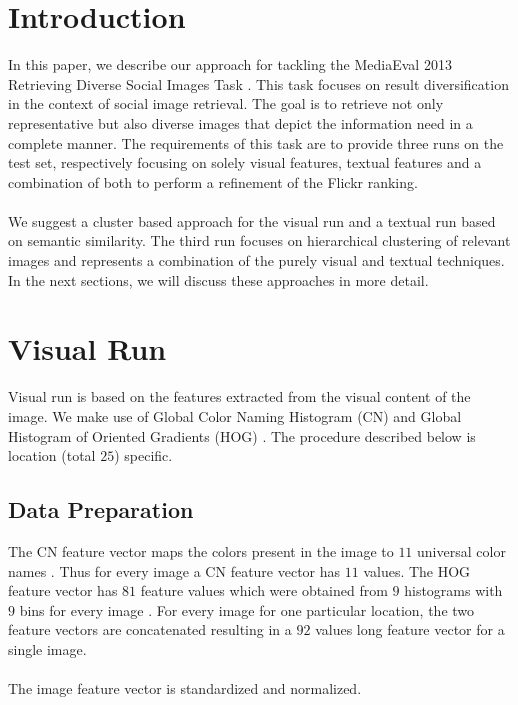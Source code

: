 \documentclass{acm_proc_article-me11_tweaked}
\begin{document}
\section{Introduction}
In this paper, we describe our approach for tackling the MediaEval 2013 Retrieving Diverse Social Images Task \cite{mediaeval-diversephotos}.
This task focuses on result diversification in the context of social image retrieval. 
The goal is to retrieve not only representative but also diverse images that depict the information need in a complete manner.
The requirements of this task are to provide three runs on the test set, respectively focusing on solely visual features, textual features and a combination of both to perform a refinement of the Flickr ranking.
\\\\
We suggest a cluster based approach for the visual run and a textual run based on semantic similarity.
The third run focuses on hierarchical clustering of relevant images and represents a combination of the purely visual and textual techniques.
In the next sections, we will discuss these approaches in more detail.

\section{Visual Run}
\label{visual-similarity}

Visual run is based on the features extracted from the visual content of the image. We make use of Global Color Naming Histogram (CN) \cite{cn-paper} and Global Histogram of Oriented Gradients (HOG) \cite{hog-paper}. 
The procedure described below is location (total $25$) specific.
\subsection{Data Preparation}
The CN feature vector maps the colors present in the image to $11$ universal color names \cite{wn-overview-paper}. 
Thus for every image a CN feature vector has $11$ values. The HOG feature vector has $81$ feature values which were obtained from $9$ histograms with $9$ bins for every image \cite{wn-overview-paper}.
For every image for one particular location, the two feature vectors are concatenated resulting in a $92$ values long feature vector for a single image.
\\\\
The image feature vector is standardized and normalized.
\end{document}
